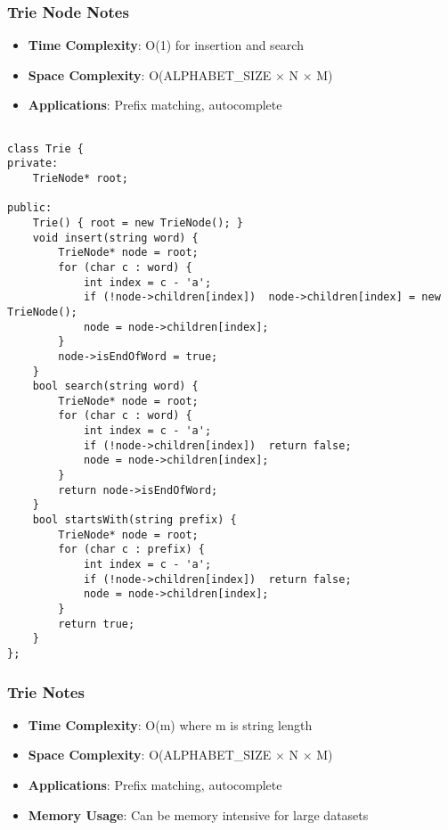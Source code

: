\documentclass[11pt,a4paper]{article}
\begin{document}
\subsubsection*{Trie Node Notes}
\begin{itemize}
\item \textbf{Time Complexity}: O(1) for insertion and search
\item \textbf{Space Complexity}: O(ALPHABET\_SIZE $\times$ N $\times$ M)
\item \textbf{Applications}: Prefix matching, autocomplete
\end{itemize}

\newpage

\begin{lstlisting}[caption={Trie Implementation}]

class Trie {
private:
    TrieNode* root;
    
public:
    Trie() { root = new TrieNode(); }
    void insert(string word) {
        TrieNode* node = root;
        for (char c : word) {
            int index = c - 'a';
            if (!node->children[index])  node->children[index] = new TrieNode();
            node = node->children[index];
        }
        node->isEndOfWord = true;
    }
    bool search(string word) {
        TrieNode* node = root;
        for (char c : word) {
            int index = c - 'a';
            if (!node->children[index])  return false;
            node = node->children[index];
        }
        return node->isEndOfWord;
    }
    bool startsWith(string prefix) {
        TrieNode* node = root;
        for (char c : prefix) {
            int index = c - 'a';
            if (!node->children[index])  return false;
            node = node->children[index];
        }
        return true;
    }
};
\end{lstlisting}

\subsubsection*{Trie Notes}
\begin{itemize}
\item \textbf{Time Complexity}: O(m) where m is string length
\item \textbf{Space Complexity}: O(ALPHABET\_SIZE $\times$ N $\times$ M)
\item \textbf{Applications}: Prefix matching, autocomplete
\item \textbf{Memory Usage}: Can be memory intensive for large datasets
\end{itemize}
\end{document}
